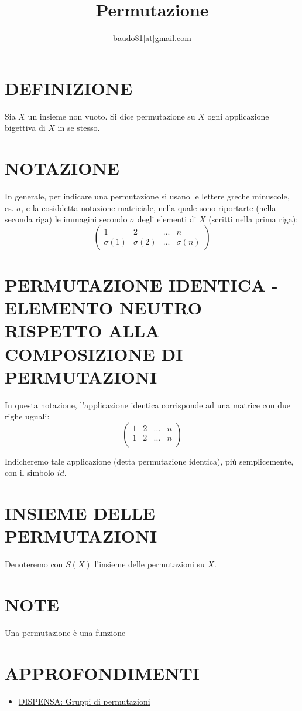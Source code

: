 \documentclass[a4paper,10pt]{article}
\title{Permutazione}
\author{baudo81[at]gmail.com}
\begin{document}
\maketitle

\section{DEFINIZIONE}
Sia $X$ un insieme non vuoto. Si dice permutazione su $X$ ogni applicazione bigettiva di $X$ in se stesso. \cite{permutazione1}

\section{NOTAZIONE}
In generale, per indicare una permutazione si usano le lettere greche minuscole, es. $\sigma$, e la cosiddetta notazione matriciale,
nella quale sono riportarte (nella seconda riga) le immagini secondo $\sigma$ degli elementi di $X$ (scritti nella prima riga):
\[
\left(
 \begin{array}{cccc}
  1 & 2 & ... & n \\
  \sigma(1) & \sigma(2) & ... & \sigma(n)
 \end{array}
\right)
\] \cite{permutazione1}

\section{PERMUTAZIONE IDENTICA - ELEMENTO NEUTRO RISPETTO ALLA COMPOSIZIONE DI PERMUTAZIONI}
In questa notazione, l'applicazione identica corrisponde ad una matrice con due righe uguali:
\[
\left(
 \begin{array}{cccc}
  1 & 2 & ... & n \\
  1 & 2 & ... & n \\
 \end{array}
\right)
\]

Indicheremo tale applicazione (detta permutazione identica), più semplicemente, con il simbolo $id$. \cite{permutazione1}

\section{INSIEME DELLE PERMUTAZIONI}
Denoteremo con $S(X)$ l'insieme delle permutazioni su $X$. \cite{permutazione1}

\section{NOTE}
Una permutazione è una funzione

\section{APPROFONDIMENTI}
\begin{itemize}
 \item \href{./pdf/PERMUTAZIONE/lezione4.pdf}{DISPENSA: Gruppi di permutazioni} \cite{permutazione1}
\end{itemize}




\end{document}

